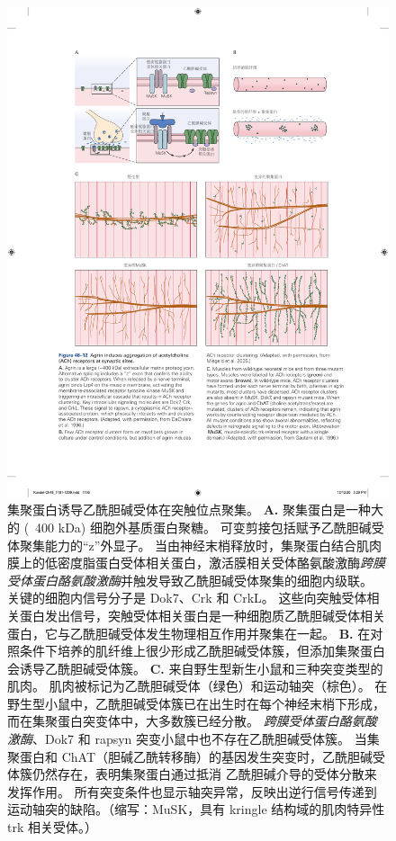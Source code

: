 \begin{figure}[htbp]
	\centering
	\includegraphics[width=0.8\linewidth]{chap48/fig_48_12}
	\caption{集聚蛋白诱导乙酰胆碱受体在突触位点聚集。
		\textbf{A.} 聚集蛋白是一种大的 (~400 kDa) 细胞外基质蛋白聚糖。
		可变剪接包括赋予乙酰胆碱受体聚集能力的“z”外显子。
		当由神经末梢释放时，集聚蛋白结合肌肉膜上的低密度脂蛋白受体相关蛋白，激活膜相关受体酪氨酸激酶\textit{跨膜受体蛋白酪氨酸激酶}并触发导致乙酰胆碱受体聚集的细胞内级联。
		关键的细胞内信号分子是 Dok7、Crk 和 CrkL。
		这些向突触受体相关蛋白发出信号，突触受体相关蛋白是一种细胞质乙酰胆碱受体相关蛋白，它与乙酰胆碱受体发生物理相互作用并聚集在一起\cite{dechiara1996receptor}。
		\textbf{B.} 在对照条件下培养的肌纤维上很少形成乙酰胆碱受体簇，但添加集聚蛋白会诱导乙酰胆碱受体簇\cite{misgeld2005agrin}。
		\textbf{C.} 来自野生型新生小鼠和三种突变类型的肌肉。
		肌肉被标记为乙酰胆碱受体（绿色）和运动轴突（棕色）。
		在野生型小鼠中，乙酰胆碱受体簇已在出生时在每个神经末梢下形成，而在集聚蛋白突变体中，大多数簇已经分散。
		\textit{跨膜受体蛋白酪氨酸激酶}、Dok7 和 rapsyn 突变小鼠中也不存在乙酰胆碱受体簇。
		当集聚蛋白和 ChAT（胆碱乙酰转移酶）的基因发生突变时，乙酰胆碱受体簇仍然存在，表明集聚蛋白通过抵消 乙酰胆碱介导的受体分散来发挥作用。
		所有突变条件也显示轴突异常，反映出逆行信号传递到运动轴突的缺陷。（缩写：MuSK，具有 kringle 结构域的肌肉特异性 trk 相关受体。）\cite{gautam1996defective} }
	\label{fig:48_12}
\end{figure}



